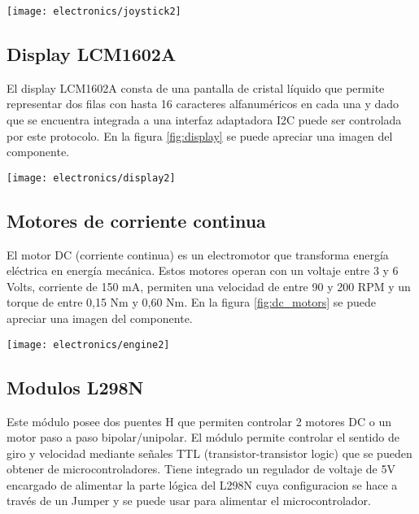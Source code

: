 \begin{center}
    \texttt{[image: electronics/joystick2]}
    \label{fig:joystick}
\end{center}


\subsection{Display LCM1602A}
El display LCM1602A \cite{LCM1602A_datasheet} consta de una pantalla de cristal líquido que permite representar dos filas con hasta 16 caracteres alfanuméricos en cada una y dado que se encuentra integrada a una interfaz adaptadora I2C puede ser controlada por este protocolo. En la figura \ref{fig:display} se puede apreciar una imagen del componente.

\begin{center}
    \texttt{[image: electronics/display2]}
    \label{fig:display}
\end{center}

\subsection{Motores de corriente continua}
El motor DC (corriente continua) \cite{dc_motor_datasheet} es un electromotor que transforma energía eléctrica en energía mecánica. Estos motores operan con un voltaje entre 3 y 6 Volts, corriente de 150 mA, permiten una velocidad de entre 90 y 200 RPM y un torque de entre 0,15 Nm y 0,60 Nm. En la figura \ref{fig:dc_motors} se puede apreciar una imagen del componente.


\begin{center}
  \texttt{[image: electronics/engine2]}
    \label{fig:dc_motors}
\end{center}
  


\subsection{Modulos L298N}
Este módulo posee dos puentes H que permiten controlar 2 motores DC o un motor paso a paso bipolar/unipolar. El módulo permite controlar el sentido de giro y velocidad mediante señales TTL (transistor-transistor logic) que se pueden obtener de microcontroladores. Tiene integrado un regulador de voltaje de 5V encargado de alimentar la parte lógica del L298N cuya configuracion se hace a través de un Jumper y se puede usar para alimentar el microcontrolador.

